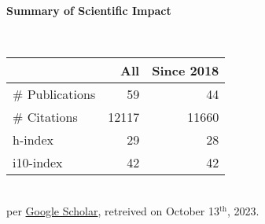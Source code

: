 \headedsection %
{\bf Summary of Scientific Impact}{}{}
{
    \qquad~~~~
    \begin{minipage}[t]{0.6\textwidth}
        \begin{tabular}{lrr}
        \hline
         & All & Since 2018\\
        \hline
        \# Publications & 59     & 44    \\
        \# Citations    & 12117  & 11660 \\
        h-index         & 29     & 28    \\
        i10-index       & 42     & 42    \\
        \hline
    \end{tabular}
    \\
    {\footnotesize{
        per \href{https://scholar.google.com/citations?user=wpLQuroAAAAJ}{Google Scholar},
        retreived on October 13$^\text{th}$, 2023.
        }
    }
    \end{minipage}

}
